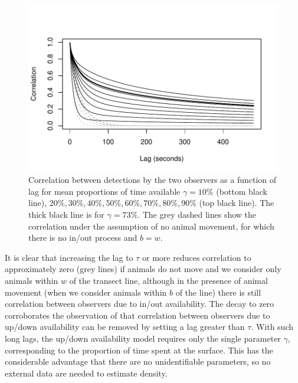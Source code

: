 \documentclass[useAMS, usenatbib, referee]{biom}\usepackage[]{graphicx}\usepackage[]{color}
\makeatletter
\def\maxwidth{ %
  \ifdim\Gin@nat@width>\linewidth
    \linewidth
  \else
    \Gin@nat@width
  \fi
}
\newenvironment{knitrout}{}{} %
\makeatother
\begin{document}
\begin{knitrout}
\color{fgcolor}\begin{figure}

{\centering \includegraphics[width=\maxwidth]{figure/fig_correlation_plot-1} 

}

\caption[Correlation between detections by the two observers as a function of lag for mean proportions of time available \(\gamma=10\%\) (bottom black line), \(20\%, 30\%, 40\%, 50\%, 60\%, 70\%, 80\%, 90\%\) (top black line)]{Correlation between detections by the two observers as a function of lag for mean proportions of time available \(\gamma=10\%\) (bottom black line), \(20\%, 30\%, 40\%, 50\%, 60\%, 70\%, 80\%, 90\%\) (top black line). The thick black line is for \(\gamma=73\%\). The grey dashed lines show the correlation under the assumption of no animal movement, for which there is no in/out process and $b=w$.}\label{fig:fig_correlation_plot}
\end{figure}


\end{knitrout}

It is clear that increasing the lag to $\tau$ or more reduces correlation to approximately zero (grey lines) if animals do not move and we consider only animals within $w$ of the transect line, although in the presence of animal movement (when we consider animals within $b$ of the line) there is still correlation between observers due to in/out availability. The decay to zero corroborates the observation of \cite{Stevenson+al:19} that correlation between observers due to up/down availability can be removed by setting a lag greater than $\tau$. With such long lags, the up/down availability model requires only the single parameter $\gamma$, corresponding to the proportion of time spent at the surface. This has the considerable advantage that there are no unidentifiable parameters, so no external data are needed to estimate density.
\end{document}

